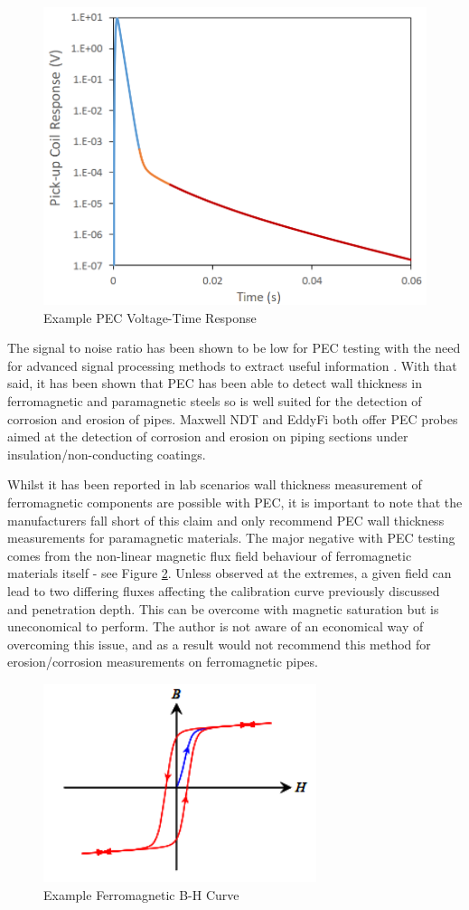 \documentclass[a4paper,twoside,11pt]{article}
\begin{document}
\begin{figure}[h]
	\includegraphics[width=0.4\linewidth]{images/Capture3.png}
	\centering
	\caption{Example PEC Voltage-Time Response \cite{fuFactorsAffectingSpatial}}
	\label{PEC}
\end{figure}

The signal to noise ratio has been shown to be low for PEC testing with the need for advanced signal processing methods to extract useful information \cite{sophianPulsedEddyCurrent2017}. 
With that said, it has been shown that PEC has been able to detect wall thickness in ferromagnetic \cite{xuAssessmentWallThinning2012}\cite{ulapaneDesigningPulsedEddy2017} and paramagnetic steels \cite{latifAPPLICATIONPECSYSTEM} so is well suited for the detection of corrosion and erosion of pipes. 
Maxwell NDT and EddyFi both offer PEC probes \cite{maxwellPECTInstrumentMaxWell2019}\cite{eddyfiPulsedEddyCurrent2019} aimed at the detection of corrosion and erosion on piping sections under insulation/non-conducting coatings. 

Whilst it has been reported in lab scenarios wall thickness measurement of ferromagnetic components are possible with PEC, it is important to note that the manufacturers fall short of this claim and only recommend PEC wall thickness measurements for paramagnetic materials. 
The major negative with PEC testing comes from the non-linear magnetic flux field behaviour of ferromagnetic materials itself - see Figure \ref{B-H}. 
Unless observed at the extremes, a given field can lead to two differing fluxes affecting the calibration curve previously discussed and penetration depth.  
This can be overcome with magnetic saturation but is uneconomical to perform. 
The author is not aware of an economical way of overcoming this issue, and as a result would not recommend this method for erosion/corrosion measurements on ferromagnetic pipes.

\begin{figure}[h]
	\includegraphics[width=8cm]{images/B-HCurve.png}
	\centering
	\caption{Example Ferromagnetic B-H Curve \cite{nagyElectromagneticNDE2019}}
	\label{B-H}
\end{figure} 
\end{document}
